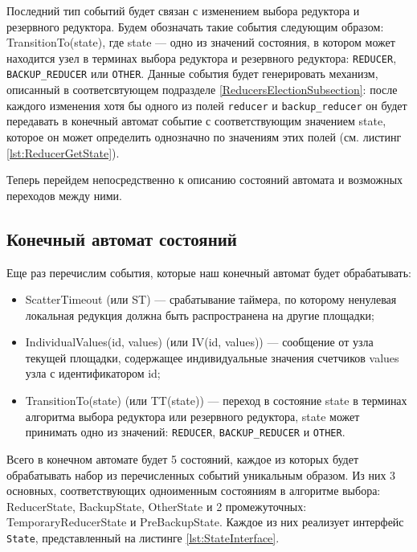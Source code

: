 \documentclass{article}
\theoremstyle{plain}
\theoremstyle{plain}
\theoremstyle{plain}
\theoremstyle{plain}
\theoremstyle{definition}
\theoremstyle{remark}
\theoremstyle{plain}
\begin{document}
Последний тип событий будет связан с изменением выбора редуктора и резервного редуктора. Будем обозначать такие события следующим образом: TransitionTo(state), где state --- одно из значений состояния, в котором может находится узел в терминах выбора редуктора и резервного редуктора: \texttt{REDUCER}, \texttt{BACKUP\_REDUCER} или \texttt{OTHER}. Данные события будет генерировать механизм, описанный в соответсвтующем подразделе \ref{ReducersElectionSubsection}: после каждого изменения хотя бы одного из полей \texttt{reducer} и \texttt{backup\_reducer} он будет передавать в конечный автомат событие с соответствующим значением state, которое он может определить однозначно по значениям этих полей (см. листинг \ref{lst:ReducerGetState}).

Теперь перейдем непосредственно к описанию состояний автомата и возможных переходов между ними.

\subsection{Конечный автомат состояний}
\label{StateMachineSubsection}

Еще раз перечислим события, которые наш конечный автомат будет обрабатывать:

\begin{itemize}
    \item ScatterTimeout (или ST) --- срабатывание таймера, по которому ненулевая локальная редукция должна быть распространена на другие площадки;
    
    \item IndividualValues(id, values) (или IV(id, values)) --- сообщение от узла текущей площадки, содержащее индивидуальные значения счетчиков values узла с идентификатором id;
    
    \item TransitionTo(state) (или TT(state)) --- переход в состояние state в терминах алгоритма выбора редуктора или резервного редуктора, state может принимать одно из значений: \texttt{REDUCER}, \texttt{BACKUP\_REDUCER} и \texttt{OTHER}.
\end{itemize}

Всего в конечном автомате будет 5 состояний, каждое из которых будет обрабатывать набор из перечисленных событий уникальным образом. Из них 3 основных, соответствующих одноименным состояниям в алгоритме выбора: ReducerState, BackupState, OtherState и 2 промежуточных: TemporaryReducerState и PreBackupState. Каждое из них реализует интерфейс \texttt{State}, представленный на листинге \ref{lst:StateInterface}.
\end{document}
